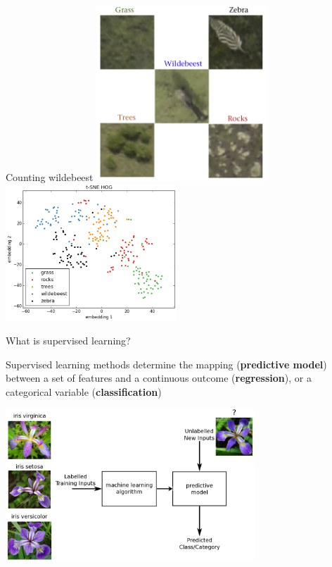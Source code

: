 \documentclass[pdf]{beamer}
\begin{document}
\begin{frame}{Counting wildebeest}
\centering
\includegraphics[width=0.48\textwidth]{04-UAV.png}\hfill
\includegraphics[width=0.48\textwidth]{tsne_hog.png}
\end{frame}

\begin{frame}{What is supervised learning?}
\begin{block}{}
Supervised learning methods determine the mapping (\textbf{predictive model}) between a set of features 
and a continuous outcome (\textbf{regression}), or a categorical variable (\textbf{classification})
\end{block}
\vfill
\centering
\includegraphics[width=0.7\textwidth]{classification.png}
\end{frame}
\end{document}
